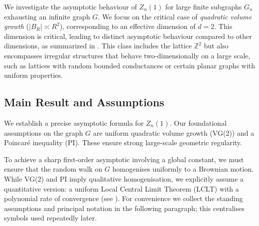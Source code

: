 \documentclass{article}
\numberwithin{equation}{section}
\theoremstyle{definition}
\theoremstyle{remark}
\begin{document}
We investigate the asymptotic behaviour of $Z_n(1)$ for large finite subgraphs $G_n$ exhausting an infinite graph $G$. We focus on the critical case of \emph{quadratic volume growth} ($|B_R| \asymp R^2$), corresponding to an effective dimension of $d=2$. This dimension is critical, leading to distinct asymptotic behaviour compared to other dimensions, as summarized in . This class includes the lattice $\mathbb{Z}^2$ but also encompasses irregular structures that behave two-dimensionally on a large scale, such as lattices with random bounded conductances or certain planar graphs with uniform properties.

\subsection{Main Result and Assumptions}
We establish a precise asymptotic formula for $Z_n(1)$. Our foundational assumptions on the graph $G$ are uniform quadratic volume growth (VG(2)) and a Poincaré inequality (PI). These ensure strong large-scale geometric regularity.

To achieve a sharp first-order asymptotic involving a global constant, we must ensure that the random walk on $G$ homogenises uniformly to a Brownian motion. While VG(2) and PI imply qualitative homogenisation, we explicitly assume a quantitative version: a uniform Local Central Limit Theorem (LCLT) with a polynomial rate of convergence (see ). For convenience we collect the standing assumptions and principal notation in the following paragraph; this centralises symbols used repeatedly later.
\end{document}
